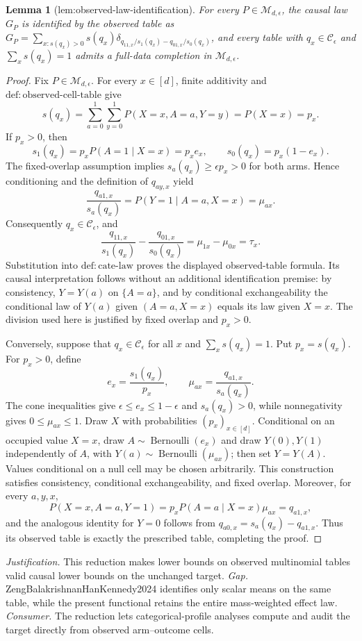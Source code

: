 \documentclass{article}
\newtheorem{lemma}{Lemma}
\begin{document}
\begin{lemma}[lem:observed-law-identification]\label{lem:observed-law-identification}
For every \(P\in\mathcal M_{d,\epsilon}\), the causal law \(G_P\) is identified by the observed table as \(G_P=\sum_{x:s(q_x)>0}s(q_x)\delta_{q_{11,x}/s_1(q_x)-q_{01,x}/s_0(q_x)}\), and every table with \(q_x\in\mathcal C_\epsilon\) and \(\sum_xs(q_x)=1\) admits a full-data completion in \(\mathcal M_{d,\epsilon}\).
\end{lemma}
\begin{proof}
Fix \(P\in\mathcal M_{d,\epsilon}\).  For every \(x\in[d]\), finite additivity and \(\mathrm{def:observed\mbox{-}cell\mbox{-}table}\) give
\[
s(q_x)=\sum_{a=0}^1\sum_{y=0}^1P(X=x,A=a,Y=y)=P(X=x)=p_x.
\]
If \(p_x>0\), then
\[
s_1(q_x)=p_xP(A=1\mid X=x)=p_xe_x,
\qquad
s_0(q_x)=p_x(1-e_x).
\]
The fixed-overlap assumption implies \(s_a(q_x)\geq\epsilon p_x>0\) for both arms.  Hence conditioning and the definition of \(q_{ay,x}\) yield
\[
\frac{q_{a1,x}}{s_a(q_x)}=P(Y=1\mid A=a,X=x)=\mu_{ax}.
\]
Consequently \(q_x\in\mathcal C_\epsilon\), and
\[
\frac{q_{11,x}}{s_1(q_x)}-\frac{q_{01,x}}{s_0(q_x)}
=\mu_{1x}-\mu_{0x}=\tau_x.
\]
Substitution into \(\mathrm{def:cate\mbox{-}law}\) proves the displayed observed-table formula.  Its causal interpretation follows without an additional identification premise: by consistency,
\(Y=Y(a)\) on \(\{A=a\}\), and by conditional exchangeability the conditional law of \(Y(a)\) given \((A=a,X=x)\) equals its law given \(X=x\).  The division used here is justified by fixed overlap and \(p_x>0\).

Conversely, suppose that \(q_x\in\mathcal C_\epsilon\) for all \(x\) and \(\sum_xs(q_x)=1\).  Put \(p_x=s(q_x)\).  For \(p_x>0\), define
\[
e_x=\frac{s_1(q_x)}{p_x},
\qquad
\mu_{ax}=\frac{q_{a1,x}}{s_a(q_x)}.
\]
The cone inequalities give \(\epsilon\leq e_x\leq1-\epsilon\) and \(s_a(q_x)>0\), while nonnegativity gives \(0\leq\mu_{ax}\leq1\).  Draw \(X\) with probabilities \((p_x)_{x\in[d]}\).  Conditional on an occupied value \(X=x\), draw \(A\sim\operatorname{Bernoulli}(e_x)\) and draw \(Y(0),Y(1)\) independently of \(A\), with \(Y(a)\sim\operatorname{Bernoulli}(\mu_{ax})\); then set \(Y=Y(A)\).  Values conditional on a null cell may be chosen arbitrarily.  This construction satisfies consistency, conditional exchangeability, and fixed overlap.  Moreover, for every \(a,y,x\),
\[
P(X=x,A=a,Y=1)=p_xP(A=a\mid X=x)\mu_{ax}=q_{a1,x},
\]
and the analogous identity for \(Y=0\) follows from \(q_{a0,x}=s_a(q_x)-q_{a1,x}\).  Thus its observed table is exactly the prescribed table, completing the proof.
\end{proof}
\par\smallskip\noindent \textit{Justification.} This reduction makes lower bounds on observed multinomial tables valid causal lower bounds on the unchanged target. \textit{Gap.} ZengBalakrishnanHanKennedy2024 identifies only scalar means on the same table, while the present functional retains the entire mass-weighted effect law. \textit{Consumer.} The reduction lets categorical-profile analyses compute and audit the target directly from observed arm--outcome cells.
\end{document}

